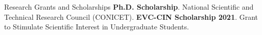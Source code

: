 \begin{rubric}{Research Grants and Scholarships}
    \textbf{Ph.D. Scholarship}. National Scientific and Technical Research Council (CONICET).
    \textbf{EVC-CIN Scholarship 2021}. Grant to Stimulate Scientific Interest in Undergraduate Students.
\end{rubric}